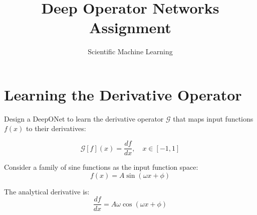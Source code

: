 \documentclass[11pt]{article}
\title{\textbf{Deep Operator Networks Assignment}}
\author{Scientific Machine Learning}
\date{}
\begin{document}
	\maketitle
	\hrulefill
	\section{Learning the Derivative Operator}
	Design a DeepONet to learn the derivative operator $\mathcal{G}$ that maps input functions $f(x)$ to their derivatives:
	
	\begin{equation*}
		\mathcal{G}[f](x) = \frac{df}{dx}, \quad x \in [-1, 1]
	\end{equation*}
	
	Consider a family of sine functions as the input function space:
	\begin{equation*}
		f(x) = A\sin(\omega x + \phi)
	\end{equation*}
	
	The analytical derivative is:
	\begin{equation*}
		\frac{df}{dx} = A\omega\cos(\omega x + \phi)
	\end{equation*}
	
\end{document}
